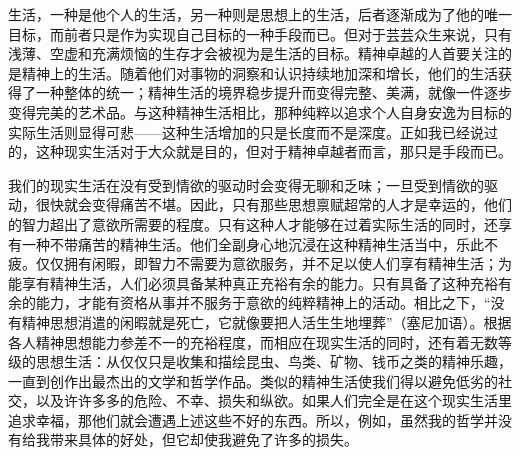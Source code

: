 \documentclass[12pt,oneside]{book}
\begin{document}
生活，一种是他个人的生活，另一种则是思想上的生活，后者逐渐成为了他的唯一目标，而前者只是作为实现自己目标的一种手段而已。但对于芸芸众生来说，只有浅薄、空虚和充满烦恼的生存才会被视为是生活的目标。精神卓越的人首要关注的是精神上的生活。随着他们对事物的洞察和认识持续地加深和增长，他们的生活获得了一种整体的统一；精神生活的境界稳步提升而变得完整、美满，就像一件逐步变得完美的艺术品。与这种精神生活相比，那种纯粹以追求个人自身安逸为目标的实际生活则显得可悲——这种生活增加的只是长度而不是深度。正如我已经说过的，这种现实生活对于大众就是目的，但对于精神卓越者而言，那只是手段而已。 

我们的现实生活在没有受到情欲的驱动时会变得无聊和乏味；一旦受到情欲的驱动，很快就会变得痛苦不堪。因此，只有那些思想禀赋超常的人才是幸运的，他们的智力超出了意欲所需要的程度。只有这种人才能够在过着实际生活的同时，还享有一种不带痛苦的精神生活。他们全副身心地沉浸在这种精神生活当中，乐此不疲。仅仅拥有闲暇，即智力不需要为意欲服务，并不足以使人们享有精神生活；为能享有精神生活，人们必须具备某种真正充裕有余的能力。只有具备了这种充裕有余的能力，才能有资格从事并不服务于意欲的纯粹精神上的活动。相比之下，“没有精神思想消遣的闲暇就是死亡，它就像要把人活生生地埋葬”（塞尼加语）。根据各人精神思想能力参差不一的充裕程度，而相应在现实生活的同时，还有着无数等级的思想生活：从仅仅只是收集和描绘昆虫、鸟类、矿物、钱币之类的精神乐趣，一直到创作出最杰出的文学和哲学作品。类似的精神生活使我们得以避免低劣的社交，以及许许多多的危险、不幸、损失和纵欲。如果人们完全是在这个现实生活里追求幸福，那他们就会遭遇上述这些不好的东西。所以，例如，虽然我的哲学并没有给我带来具体的好处，但它却使我避免了许多的损失。 
\end{document}
